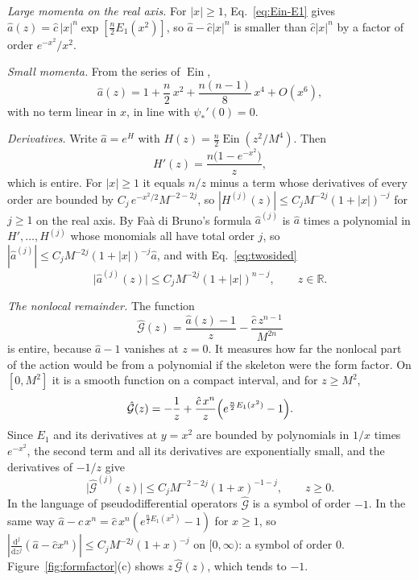 \documentclass[aps,prd,10pt,twocolumn,superscriptaddress,nofootinbib,floatfix,longbibliography]{revtex4-2}
\newcommand{\bR}{\mathbb{R}}
\newcommand{\dd}{\mathrm{d}}
\newcommand{\Ein}{\operatorname{Ein}}
\begin{document}
\textit{Large momenta on the real axis.} For $|x|\ge1$, Eq.~\eqref{eq:Ein-E1} gives $\hat a(z)=\hat c\,|x|^{n}\exp[\frac n2E_1(x^2)]$, so $\hat a-\hat c|x|^n$ is smaller than $\hat c|x|^n$ by a factor of order $e^{-x^2}/x^2$.

\textit{Small momenta.} From the series of $\Ein$,
\begin{equation}
\label{eq:IR}
\hat a(z)=1+\frac n2\,x^2+\frac{n(n-1)}8\,x^4+O(x^6),
\end{equation}
with no term linear in $x$, in line with $\psi_*'(0)=0$.

\textit{Derivatives.} Write $\hat a=e^{H}$ with $H(z)=\frac n2\Ein(z^2/M^4)$. Then
\[
H'(z)=\frac{n\bigl(1-e^{-x^2}\bigr)}{z},
\]
which is entire. For $|x|\ge1$ it equals $n/z$ minus a term whose derivatives of every order are bounded by $C_j\,e^{-x^2/2}M^{-2-2j}$, so $|H^{(j)}(z)|\le C_jM^{-2j}(1+|x|)^{-j}$ for $j\ge1$ on the real axis. By Fa\`a di Bruno's formula $\hat a^{(j)}$ is $\hat a$ times a polynomial in $H',\dots,H^{(j)}$ whose monomials all have total order $j$, so $|\hat a^{(j)}|\le C_jM^{-2j}(1+|x|)^{-j}\hat a$, and with Eq.~\eqref{eq:twosided}
\begin{equation}
\label{eq:aderiv}
\bigl|\hat a^{(j)}(z)\bigr|\le C_jM^{-2j}(1+|x|)^{n-j},\qquad z\in\bR .
\end{equation}

\textit{The nonlocal remainder.} The function
\begin{equation}
\label{eq:Ghat}
\hat{\mathcal G}(z)=\frac{\hat a(z)-1}{z}-\frac{\hat c\,z^{n-1}}{M^{2n}}
\end{equation}
is entire, because $\hat a-1$ vanishes at $z=0$. It measures how far the nonlocal part of the action would be from a polynomial if the skeleton were the form factor. On $[0,M^2]$ it is a smooth function on a compact interval, and for $z\ge M^2$,
\[
\hat{\mathcal G}(z)=-\frac1z+\frac{\hat c\,x^n}{z}\Bigl(e^{\frac n2E_1(x^2)}-1\Bigr).
\]
Since $E_1$ and its derivatives at $y=x^2$ are bounded by polynomials in $1/x$ times $e^{-x^2}$, the second term and all its derivatives are exponentially small, and the derivatives of $-1/z$ give
\begin{equation}
\label{eq:Ghatsymbol}
\bigl|\hat{\mathcal G}^{(j)}(z)\bigr|\le C_jM^{-2-2j}(1+x)^{-1-j},\qquad z\ge0 .
\end{equation}
In the language of pseudodifferential operators $\hat{\mathcal G}$ is a symbol of order $-1$. In the same way $\hat a-\hat c\,x^n=\hat c\,x^n(e^{\frac n2E_1(x^2)}-1)$ for $x\ge1$, so $|\frac{\dd^j}{\dd z^j}(\hat a-\hat cx^n)|\le C_jM^{-2j}(1+x)^{-j}$ on $[0,\infty)$: a symbol of order $0$. Figure~\ref{fig:formfactor}(c) shows $z\,\hat{\mathcal G}(z)$, which tends to $-1$.
\end{document}
